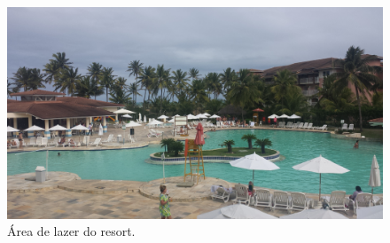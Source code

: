 \documentclass[12pt,a4paper]{article}
\begin{document}
\begin{figure}[h!]	
	\includegraphics[width=\columnwidth]{figs/piscina.jpg}
	\caption{Área de lazer do resort.}
	\label{fig::piscina}
\end{figure}


\end{document}
